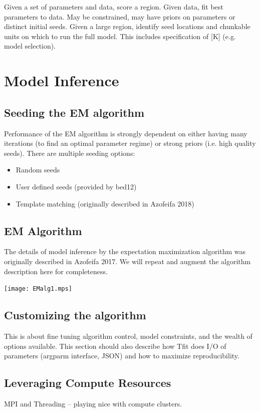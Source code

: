 \documentclass[11pt]{article}
\begin{document}
Given a set of parameters and data, score a region.
Given data, fit best parameters to data.  May be constrained, may have 
priors on parameters or distinct initial seeds.
Given a large region, identify seed locations and chunkable units on which to
run the full model.   This includes specification of [K] (e.g. model selection).

\section{Model Inference}

\subsection{Seeding the EM algorithm}
\label{seeds}
Performance of the EM algorithm is strongly dependent on either having 
many iterations (to find an optimal parameter regime) or strong priors
(i.e. high quality seeds).  There are multiple seeding options:

\begin{itemize}
\item Random seeds
\item User defined seeds (provided by bed12)
\item Template matching (originally described in Azofeifa 2018)
\end{itemize}

\subsection{EM Algorithm}
The details of model inference by the expectation maximization algorithm was
originally described in Azofeifa 2017.  We will repeat and augment the 
algorithm description here for completeness.

\texttt{[image: EMalg1.mps]}

\subsection{Customizing the algorithm}
This is about fine tuning algorithm control, model constraints, and 
the wealth of options available.   This section should also describe 
how Tfit does I/O of parameters (argparm interface, JSON) and how
to maximize reproducibility. 

\subsection{Leveraging Compute Resources}
MPI and Threading -- playing nice with compute clusters.

\small{
  
  {}
}
\end{document}
